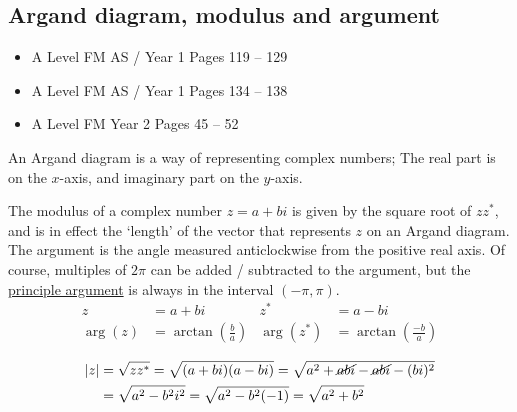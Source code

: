 \documentclass[11pt, a4paper]{article}
\begin{document}
\subsection{Argand diagram, modulus and argument}
\begin{itemize}
\item A Level FM AS / Year 1 \hspace{1cm} Pages 119 -- 129
\item A Level FM AS / Year 1 \hspace{1cm} Pages 134 -- 138
\item A Level FM Year 2 \hspace{1cm} \phantom{AS /} Pages 45 -- 52
\end{itemize} \par
An Argand diagram is a way of representing complex numbers; The real part is on the $x$-axis, and imaginary part on the $y$-axis.
\begin{figure}[H]
\centering
{}
\end{figure}
The modulus of a complex number $z=a+bi$ is given by the square root of $zz^{*}$, and is in effect the `length' of the vector that represents $z$ on an Argand diagram. The argument is the angle measured anticlockwise from the positive real axis. Of course, multiples of $2\pi$ can be added / subtracted to the argument, but the \underline{principle argument} is always in the interval $(-\pi,\pi)$.
\begin{align*}
z&=a+bi & z^{*}&=a-bi \\
\arg(z)&=\arctan\left(\frac{b}{a}\right) & \arg\left( z^{*} \right)&=\arctan\left(\frac{-b}{a}\right) \\
\end{align*}
\vspace{-1cm}
\begin{align*}
|z|&=\sqrt{zz^{*}}=\sqrt{(a+bi)(a-bi)}=\sqrt{a^{2}+\cancel{abi}-\cancel{abi}-(bi)^{2}} \\
&=\sqrt{a^{2}-b^{2}i^{2}}=\sqrt{a^{2}-b^{2}(-1)}=\sqrt{a^{2}+b^{2}}
\end{align*}
\end{document}
